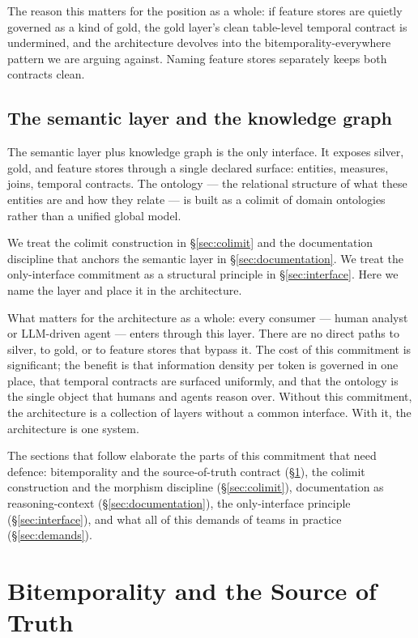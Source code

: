 \documentclass[11pt,a4paper]{article}
\begin{document}
The reason this matters for the position as a whole: if feature stores are quietly governed as a kind of gold, the gold layer's clean table-level temporal contract is undermined, and the architecture devolves into the bitemporality-everywhere pattern we are arguing against. Naming feature stores separately keeps both contracts clean.

\subsection{The semantic layer and the knowledge graph}

The semantic layer plus knowledge graph is the only interface. It exposes silver, gold, and feature stores through a single declared surface: entities, measures, joins, temporal contracts. The ontology --- the relational structure of what these entities are and how they relate --- is built as a colimit of domain ontologies rather than a unified global model.

We treat the colimit construction in \S\ref{sec:colimit} and the documentation discipline that anchors the semantic layer in \S\ref{sec:documentation}. We treat the only-interface commitment as a structural principle in \S\ref{sec:interface}. Here we name the layer and place it in the architecture.

What matters for the architecture as a whole: every consumer --- human analyst or LLM-driven agent --- enters through this layer. There are no direct paths to silver, to gold, or to feature stores that bypass it. The cost of this commitment is significant; the benefit is that information density per token is governed in one place, that temporal contracts are surfaced uniformly, and that the ontology is the single object that humans and agents reason over. Without this commitment, the architecture is a collection of layers without a common interface. With it, the architecture is one system.

The sections that follow elaborate the parts of this commitment that need defence: bitemporality and the source-of-truth contract (\S\ref{sec:bitemporality}), the colimit construction and the morphism discipline (\S\ref{sec:colimit}), documentation as reasoning-context (\S\ref{sec:documentation}), the only-interface principle (\S\ref{sec:interface}), and what all of this demands of teams in practice (\S\ref{sec:demands}).

\section{Bitemporality and the Source of Truth}
\label{sec:bitemporality}
\end{document}
